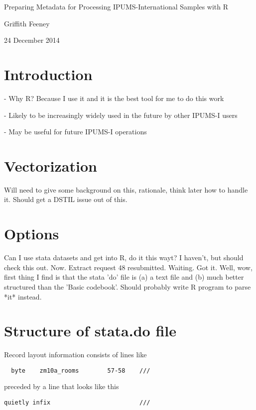 



Preparing Metadata for Processing IPUMS-International Samples with R

Griffith Feeney

24 December 2014


\section{Introduction}

 - Why R? Because I use it and it is the best tool for me to do this work

 - Likely to be increasingly widely used in the future by other IPUMS-I users
 
 - May be useful for future IPUMS-I operations
 
 
 \section{Vectorization}

 Will need to give some background on this, rationale, think later how to handle it. Should get a DSTIL issue out of this.
 
 
\section{Options}

Can I use stata datasets and get into R, do it this wayt? I haven't, but should check this out. Now. Extract request 48 resubmitted. Waiting. Got it. Well, wow, first thing I find is that the stata 'do' file is (a) a text file and (b) much better structured than the 'Basic codebook'. Should probably write R program to parse *it* instead.

\section{Structure of stata.do file}

Record layout information consists of lines like

\begin{verbatim}
  byte    zm10a_rooms        57-58    ///
\end{verbatim}

preceded by a line that looks like this

\begin{verbatim}
quietly infix                         ///
\end{verbatim}

